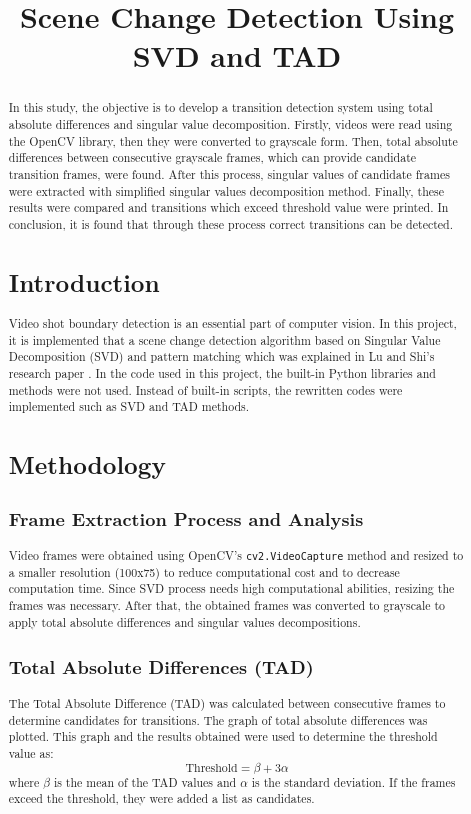 \documentclass[conference]{IEEEtran}
\title{Scene Change Detection Using SVD and TAD}
\author{\IEEEauthorblockN{Muhammed Sait Çağlar}
\IEEEauthorblockA{Department of Computer Engineering\\
Istanbul Technical University\\
Email: caglarm23@itu.edu.tr}}
\begin{document}
\maketitle

\begin{abstract}
In this study, the objective is to develop a transition detection system using total absolute differences and singular value decomposition. Firstly, videos were read using the OpenCV library, then they were converted to grayscale form. Then, total absolute differences between consecutive grayscale frames, which can provide candidate transition frames, were found. After this process, singular values of candidate frames were extracted with simplified singular values decomposition method. Finally, these results were compared and transitions which exceed threshold value were printed. In conclusion, it is found that through these process correct transitions  can be detected. 

\section{Introduction}
Video shot boundary detection is an essential part of computer vision. In this project, it is implemented that a scene change detection algorithm based on Singular Value Decomposition (SVD) and pattern matching which was explained in Lu and Shi's research paper \cite{lu2013}. In the code used in this project, the built-in Python libraries and methods were not used. Instead of built-in scripts, the rewritten codes were implemented such as SVD and TAD methods.
\section{Methodology}
\subsection{Frame Extraction Process and Analysis}
Video frames were obtained using OpenCV's \texttt{cv2.VideoCapture} method and resized to a smaller resolution (100x75) to reduce computational cost and to decrease computation time. Since SVD process needs high computational abilities, resizing the frames was necessary.  After that, the obtained frames was converted to grayscale to apply total absolute differences and singular values decompositions.

\subsection{Total Absolute Differences (TAD)}
The Total Absolute Difference (TAD) was calculated between consecutive frames to determine candidates for transitions. The graph of total absolute differences was plotted. This graph and the results obtained were used to determine the threshold value as:
\[
\text{Threshold} = \beta + 3\alpha
\]
where $\beta$ is the mean of the TAD values and $\alpha$ is the standard deviation. If the frames exceed the threshold, they were added a list as candidates.


\end{abstract}
\end{document}

